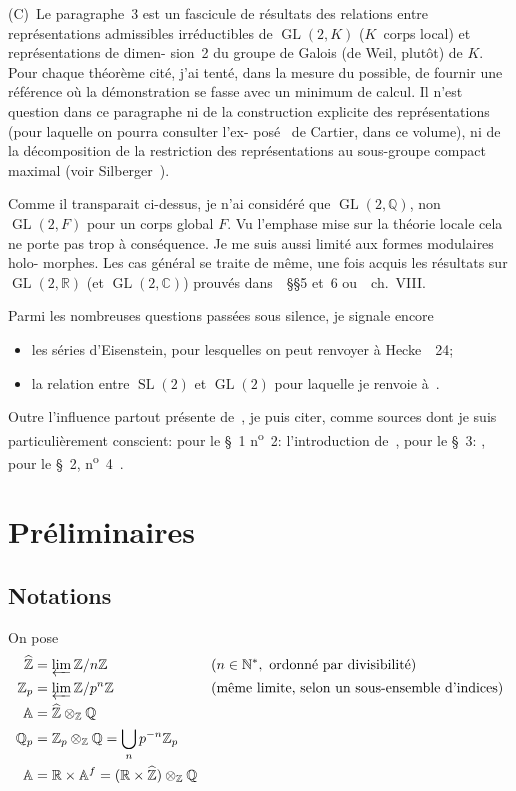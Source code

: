 \documentclass[11pt,a4paper]{amsart}
\theoremstyle{plain}
\theoremstyle{definition}
\theoremstyle{remark}
\DeclareMathOperator{\GL}{GL}
\DeclareMathOperator{\SL}{SL}
\newcommand{\ZZ}{\mathbb{Z}}
\newcommand{\QQ}{\mathbb{Q}}
\newcommand{\RR}{\mathbb{R}}
\newcommand{\CC}{\mathbb{C}}
\newcommand{\NN}{\mathbb{N}}
\newcommand{\Af}{\mathbb{A}}
\newcommand{\wh}{\widehat}
\begin{document}
(C)~Le paragraphe~3 est un fascicule de r\'esultats des relations entre repr\'esentations
admissibles irr\'eductibles de $\GL(2,K)$ ($K$~corps local) et repr\'esentations de dimen-
sion~2 du groupe de Galois (de Weil, plut\^ot) de $K$. Pour chaque th\'eor\`eme cit\'e, j'ai
tent\'e, dans la mesure du possible, de fournir une r\'ef\'erence o\`u la d\'emonstration se
fasse avec un minimum de calcul. Il n'est question dans ce paragraphe ni de la
construction explicite des repr\'esentations (pour laquelle on pourra consulter l'ex-
pos\'e~\cite{Cartier} de Cartier, dans ce volume), ni de la d\'ecomposition de la restriction des
repr\'esentations au sous-groupe compact maximal (voir Silberger~\cite{Silberger}).

Comme il transparait ci-dessus, je n'ai consid\'er\'e que $\GL(2,\QQ)$, non
$\GL(2,F)$ pour un corps global $F$. Vu l'emphase mise sur la th\'eorie locale cela ne
porte pas trop \`a cons\'equence. Je me suis aussi limit\'e aux formes modulaires holo-
morphes. Les cas g\'en\'eral se traite de m\^eme, une fois acquis les r\'esultats sur
$\GL(2,\RR)$ (et $\GL(2,\CC)$) prouv\'es dans~\cite{JL}~\S\S 5 et~6 ou~\cite{Langlands}~ch.~VIII.

Parmi les nombreuses questions pass\'ees sous silence, je signale encore
\begin{itemize}
\item les s\'eries d'Eisenstein, pour lesquelles on peut renvoyer \`a Hecke~\cite{Hecke}~24;
\item la relation entre $\SL(2)$ et $\GL(2)$ pour laquelle je renvoie \`a~\cite{Jacquet}.
\end{itemize}

Outre l'influence partout pr\'esente de~\cite{JL}, je puis citer, comme sources
dont je suis particuli\`erement conscient:
pour le \S\ 1 n\textsuperscript{o}\ 2: l'introduction de~\cite{Weil}, pour le \S\ 3: \cite{Tate}, pour le \S\ 2, n\textsuperscript{o}\ 4~\cite{Casselman}.

\section{Pr\'eliminaires}

\subsection{Notations}

On pose
\begin{align*}
\wh{\ZZ} &= \varprojlim \ZZ/n\ZZ && (n \in \NN^*, \text{ ordonn\'e par divisibilit\'e}) \\
\ZZ_p &= \varprojlim \ZZ/p^n\ZZ && \text{(m\^eme limite, selon un sous-ensemble d'indices)} \\
\Af &= \wh{\ZZ} \otimes_{\ZZ} \QQ \\
\QQ_p &= \ZZ_p \otimes_{\ZZ} \QQ = \bigcup_n p^{-n} \ZZ_p \\
\Af &= \RR \times \Af^f = (\RR \times \wh{\ZZ}) \otimes_{\ZZ} \QQ
\end{align*}
\end{document}
